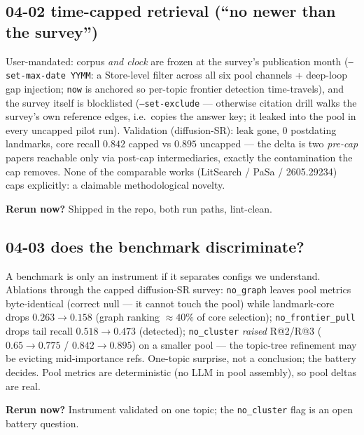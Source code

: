 \documentclass[10pt]{article}
\newcommand{\rerun}[1]{\par\smallskip\noindent\textbf{Rerun now?} #1}
\begin{document}
\subsection*{04-02 time-capped retrieval (``no newer than the survey'')}
User-mandated: corpus \emph{and clock} are frozen at the survey's publication month
(\texttt{--set-max-date YYMM}: a Store-level filter across all six pool channels + deep-loop
gap injection; \texttt{now} is anchored so per-topic frontier detection time-travels), and the
survey itself is blocklisted (\texttt{--set-exclude} --- otherwise citation drill walks the
survey's own reference edges, i.e.\ copies the answer key; it leaked into the pool in every
uncapped pilot run). Validation (diffusion-SR): leak gone, 0 postdating landmarks, core recall
$0.842$ capped vs $0.895$ uncapped --- the delta is two \emph{pre-cap} papers reachable only
via post-cap intermediaries, exactly the contamination the cap removes. None of the comparable
works (LitSearch / PaSa / 2605.29234) caps explicitly: a claimable methodological novelty.
\rerun{Shipped in the repo, both run paths, lint-clean.}

\subsection*{04-03 does the benchmark discriminate?}
A benchmark is only an instrument if it separates configs we understand. Ablations through the
capped diffusion-SR survey: \texttt{no\_graph} leaves pool metrics byte-identical (correct
null --- it cannot touch the pool) while landmark-core drops $0.263 \to 0.158$ (graph ranking
${\approx}40\%$ of core selection); \texttt{no\_frontier\_pull} drops tail recall
$0.518 \to 0.473$ (detected); \texttt{no\_cluster} \emph{raised} R@2/R@3
($0.65 \to 0.775$ / $0.842 \to 0.895$) on a smaller pool --- the topic-tree refinement may be
evicting mid-importance refs. One-topic surprise, not a conclusion; the battery decides. Pool
metrics are deterministic (no LLM in pool assembly), so pool deltas are real.
\rerun{Instrument validated on one topic; the \texttt{no\_cluster} flag is an open battery question.}
\end{document}
